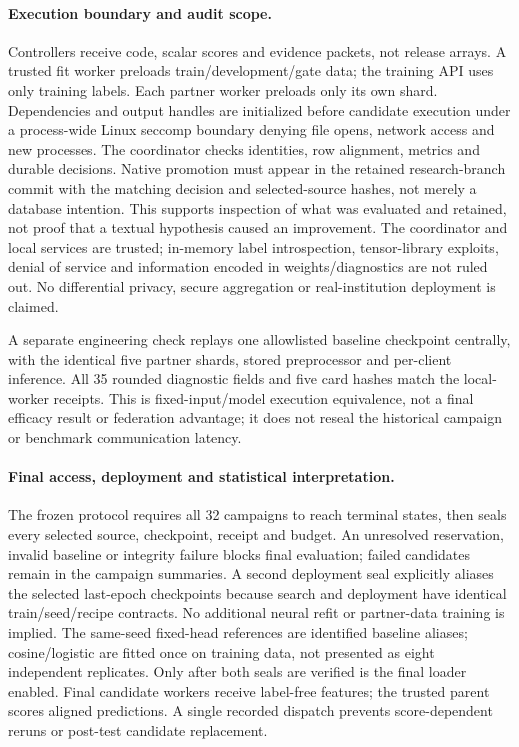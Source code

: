 \paragraph{Execution boundary and audit scope.}
Controllers receive code, scalar scores and evidence packets, not release
arrays. A trusted fit worker preloads train/development/gate data; the
training API uses only training labels. Each partner worker preloads only
its own shard. Dependencies and output handles are initialized before
candidate execution under a process-wide Linux seccomp boundary denying
file opens, network access and new processes. The coordinator checks
identities, row alignment, metrics and durable decisions. Native promotion
must appear in the retained research-branch commit with the matching
decision and selected-source hashes, not merely a database intention.
This supports inspection of what was evaluated and retained, not proof
that a textual hypothesis caused an improvement. The coordinator and local
services are trusted; in-memory label introspection, tensor-library exploits,
denial of service and information encoded in weights/diagnostics are not
ruled out. No differential privacy, secure aggregation or real-institution
deployment is claimed.

A separate engineering check replays one allowlisted baseline checkpoint
centrally, with the identical five partner shards, stored preprocessor and
per-client inference. All 35 rounded diagnostic fields and five card hashes
match the local-worker receipts. This is fixed-input/model execution
equivalence, not a final efficacy result or federation advantage; it does
not reseal the historical campaign or benchmark communication latency.

\paragraph{Final access, deployment and statistical interpretation.}
The frozen protocol requires all 32 campaigns to reach terminal states,
then seals every selected source, checkpoint, receipt and budget.
An unresolved reservation, invalid baseline or integrity failure blocks
final evaluation; failed candidates remain in the campaign summaries.
A second deployment seal explicitly aliases the selected last-epoch
checkpoints because search and deployment have identical train/seed/recipe
contracts. No additional neural refit or partner-data training is implied.
The same-seed fixed-head references are identified baseline aliases;
cosine/logistic are fitted once on training data, not presented as eight
independent replicates. Only after both seals are verified is the final
loader enabled. Final candidate workers receive label-free features;
the trusted parent scores aligned predictions. A single recorded dispatch
prevents score-dependent reruns or post-test candidate replacement.

